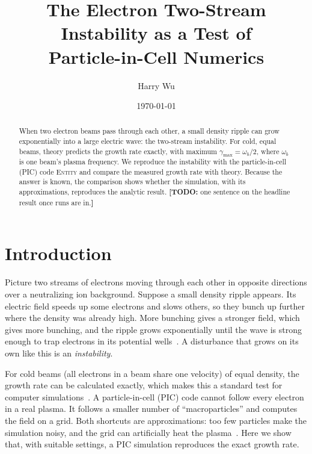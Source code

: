 \documentclass[10pt,twocolumn,letterpaper]{article}
\title{\vspace{-1.5em}The Electron Two-Stream Instability as a Test of\\
       Particle-in-Cell Numerics}
\author{Harry Wu}
\date{\today}
\newcommand{\wb}{\omega_b}            %
\newif\ifdraft \drafttrue
\newcommand{\todo}[1]{\ifdraft{\color{red}\textbf{[TODO:} #1\textbf{]}}\fi}
\begin{document}
\maketitle

\begin{abstract}
\noindent
When two electron beams pass through each other, a small density ripple can grow exponentially
into a large electric wave: the two-stream instability. For cold, equal beams, theory predicts
the growth rate exactly, with maximum $\gamma_{\max}=\wb/2$, where $\wb$ is one beam's plasma
frequency. We reproduce the instability with the particle-in-cell (PIC) code \textsc{Entity}
and compare the measured growth rate with theory. Because the answer is known, the comparison
shows whether the simulation, with its approximations, reproduces the analytic result.
\todo{one sentence on the headline result once runs are in.}
\end{abstract}

\section{Introduction}
\label{sec:intro}

Picture two streams of electrons moving through each other in opposite directions over a
neutralizing ion background. Suppose a small density ripple appears. Its electric field speeds
up some electrons and slows others, so they bunch up further where the density was already high.
More bunching gives a stronger field, which gives more bunching, and the ripple grows
exponentially until the wave is strong enough to trap electrons in its potential
wells~\citep{BohmGross1949,Chen2016}. A disturbance that grows on its own like this is an
\emph{instability}.

For cold beams (all electrons in a beam share one velocity) of equal density, the growth rate
can be calculated exactly, which makes this a standard test for computer
simulations~\citep{BirdsallLangdon1991}. A particle-in-cell (PIC) code cannot follow every
electron in a real plasma. It follows a smaller number of ``macroparticles'' and computes the
field on a grid. Both shortcuts are approximations: too few particles make the simulation noisy,
and the grid can artificially heat the plasma~\citep{Langdon1970,Okuda1972}. Here we show that,
with suitable settings, a PIC simulation reproduces the exact growth rate.

\end{document}
